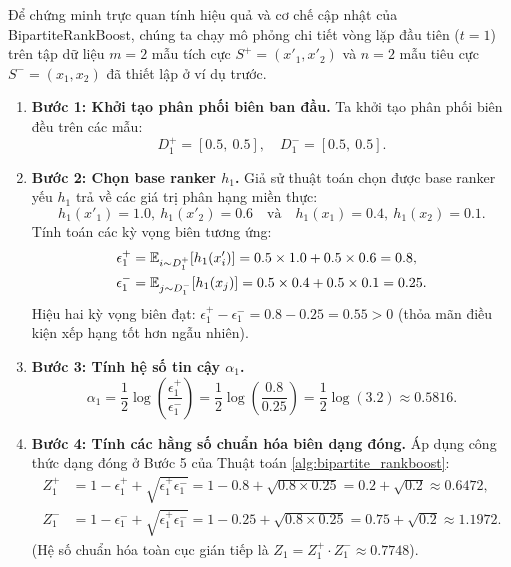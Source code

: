 \begin{example}
Để chứng minh trực quan tính hiệu quả và cơ chế cập nhật của BipartiteRankBoost, chúng ta chạy mô phỏng chi tiết vòng lặp đầu tiên ($t = 1$) trên tập dữ liệu $m=2$ mẫu tích cực $S^+ = (x'_1, x'_2)$ và $n=2$ mẫu tiêu cực $S^- = (x_1, x_2)$ đã thiết lập ở ví dụ trước.

\begin{enumerate}
    \item \textbf{Bước 1: Khởi tạo phân phối biên ban đầu.}
    Ta khởi tạo phân phối biên đều trên các mẫu:
    \[
        D^+_1 = [0.5, \ 0.5], \quad D^-_1 = [0.5, \ 0.5].
    \]
    
    \item \textbf{Bước 2: Chọn base ranker $h_1$.}
    Giả sử thuật toán chọn được base ranker yếu $h_1$ trả về các giá trị phân hạng miền thực:
    \[
        h_1(x'_1) = 1.0, \ h_1(x'_2) = 0.6 \quad \text{và} \quad h_1(x_1) = 0.4, \ h_1(x_2) = 0.1.
    \]
    Tính toán các kỳ vọng biên tương ứng:
    \begin{align*}
        \epsilon^+_1 &= \mathbb{E}_{i \sim D^+_1}[h_1(x'_i)] = 0.5 \times 1.0 + 0.5 \times 0.6 = 0.8, \\
        \epsilon^-_1 &= \mathbb{E}_{j \sim D^-_1}[h_1(x_j)] = 0.5 \times 0.4 + 0.5 \times 0.1 = 0.25.
    \end{align*}
    Hiệu hai kỳ vọng biên đạt: $\epsilon^+_1 - \epsilon^-_1 = 0.8 - 0.25 = 0.55 > 0$ (thỏa mãn điều kiện xếp hạng tốt hơn ngẫu nhiên).
    
    \item \textbf{Bước 3: Tính hệ số tin cậy $\alpha_1$.}
    \[
        \alpha_1 = \frac{1}{2} \log\left( \frac{\epsilon^+_1}{\epsilon^-_1} \right) = \frac{1}{2} \log\left( \frac{0.8}{0.25} \right) = \frac{1}{2} \log(3.2) \approx 0.5816.
    \]
    
    \item \textbf{Bước 4: Tính các hằng số chuẩn hóa biên dạng đóng.}
    Áp dụng công thức dạng đóng ở Bước 5 của Thuật toán \ref{alg:bipartite_rankboost}:
    \begin{align*}
        Z^+_1 &= 1 - \epsilon^+_1 + \sqrt{\epsilon^+_1 \epsilon^-_1} = 1 - 0.8 + \sqrt{0.8 \times 0.25} = 0.2 + \sqrt{0.2} \approx 0.6472, \\
        Z^-_1 &= 1 - \epsilon^-_1 + \sqrt{\epsilon^+_1 \epsilon^-_1} = 1 - 0.25 + \sqrt{0.8 \times 0.25} = 0.75 + \sqrt{0.2} \approx 1.1972.
    \end{align*}
    (Hệ số chuẩn hóa toàn cục gián tiếp là $Z_1 = Z^+_1 \cdot Z^-_1 \approx 0.7748$).
    

\end{enumerate}
\end{example}
